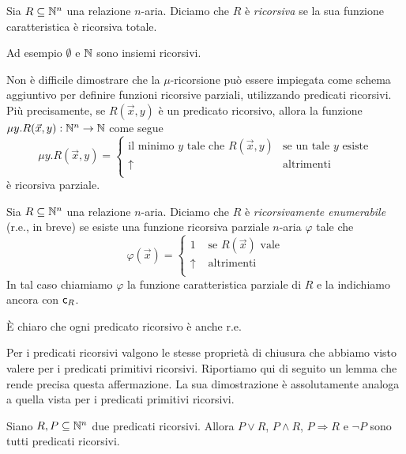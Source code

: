 \documentclass[runningheads,a4paper]{llncs}
\begin{document}
\begin{definition}
Sia $R \subseteq \mathbb{N}^n$ una relazione $n$-aria. Diciamo che $R$ \`{e} \emph{ricorsiva} se la sua funzione
 caratteristica \`{e} ricorsiva totale.
\end{definition}

Ad esempio $\emptyset$ e $\mathbb{N}$ sono insiemi ricorsivi.

Non \`{e} difficile dimostrare che la $\mu$-ricorsione pu\`{o} essere impiegata come schema aggiuntivo per definire funzioni
 ricorsive parziali, utilizzando predicati ricorsivi. Pi\`{u} precisamente, se $R(\vec x,y)$ \`{e} un predicato ricorsivo, allora
 la funzione $\mu y.R(\vec x,y): \mathbb{N}^n \to \mathbb{N}$ come segue
$$
\mu y.R({\vec x},y) = 
\begin{cases}
\mbox{il minimo $y$ tale che $R(\vec{x},y)$} & \mbox{se un tale $y$ esiste} \\
\uparrow & \mbox{altrimenti} \\
\end{cases}
$$ 
\`{e} ricorsiva parziale.

\begin{definition}
Sia $R \subseteq \mathbb{N}^n$ una relazione $n$-aria. Diciamo che $R$ \`{e} \emph{ricorsivamente enumerabile} (r.e., in breve)
 se esiste una funzione ricorsiva parziale $n$-aria $\varphi$ tale che
$$
\varphi(\vec x) = 
\begin{cases}
1        & \mbox{ se $R(\vec x)$ vale} \\
\uparrow & \mbox{ altrimenti } \\
\end{cases}
$$
In tal caso chiamiamo $\varphi$ la funzione caratteristica parziale di $R$ e la indichiamo ancora con $\mathsf{c}_{R}$.
\end{definition}

\`{E} chiaro che ogni predicato ricorsivo \`{e} anche r.e.

Per i predicati ricorsivi valgono le stesse propriet\`{a} di chiusura che abbiamo visto valere per i predicati primitivi ricorsivi.
 Riportiamo qui di seguito un lemma che rende precisa questa affermazione. La sua dimostrazione \`{e} assolutamente analoga a quella vista
 per i predicati primitivi ricorsivi. 

\begin{lemma}\label{lem:log-clos}
Siano $R,P \subseteq \mathbb{N}^n$ due predicati ricorsivi. Allora $P \vee R$, $P \wedge R$, $P \Rightarrow R$ e $\neg P$ sono tutti predicati ricorsivi.
\end{lemma}
\end{document}
